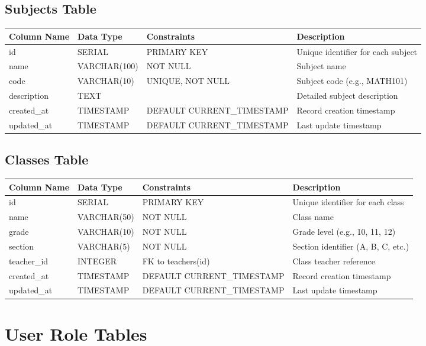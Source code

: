 \documentclass[11pt,a4paper]{article}
\begin{document}
\subsection{Subjects Table}
\begin{longtable}{|p{3cm}|p{3cm}|p{2cm}|p{6cm}|}
\hline
\textbf{Column Name} & \textbf{Data Type} & \textbf{Constraints} & \textbf{Description} \\
\hline
\endhead
id & SERIAL & PRIMARY KEY & Unique identifier for each subject \\
\hline
name & VARCHAR(100) & NOT NULL & Subject name \\
\hline
code & VARCHAR(10) & UNIQUE, NOT NULL & Subject code (e.g., MATH101) \\
\hline
description & TEXT & & Detailed subject description \\
\hline
created\_at & TIMESTAMP & DEFAULT CURRENT\_TIMESTAMP & Record creation timestamp \\
\hline
updated\_at & TIMESTAMP & DEFAULT CURRENT\_TIMESTAMP & Last update timestamp \\
\hline
\end{longtable}

\subsection{Classes Table}
\begin{longtable}{|p{3cm}|p{3cm}|p{2cm}|p{6cm}|}
\hline
\textbf{Column Name} & \textbf{Data Type} & \textbf{Constraints} & \textbf{Description} \\
\hline
\endhead
id & SERIAL & PRIMARY KEY & Unique identifier for each class \\
\hline
name & VARCHAR(50) & NOT NULL & Class name \\
\hline
grade & VARCHAR(10) & NOT NULL & Grade level (e.g., 10, 11, 12) \\
\hline
section & VARCHAR(5) & NOT NULL & Section identifier (A, B, C, etc.) \\
\hline
teacher\_id & INTEGER & FK to teachers(id) & Class teacher reference \\
\hline
created\_at & TIMESTAMP & DEFAULT CURRENT\_TIMESTAMP & Record creation timestamp \\
\hline
updated\_at & TIMESTAMP & DEFAULT CURRENT\_TIMESTAMP & Last update timestamp \\
\hline
\end{longtable}

\section{User Role Tables}
\end{document}
